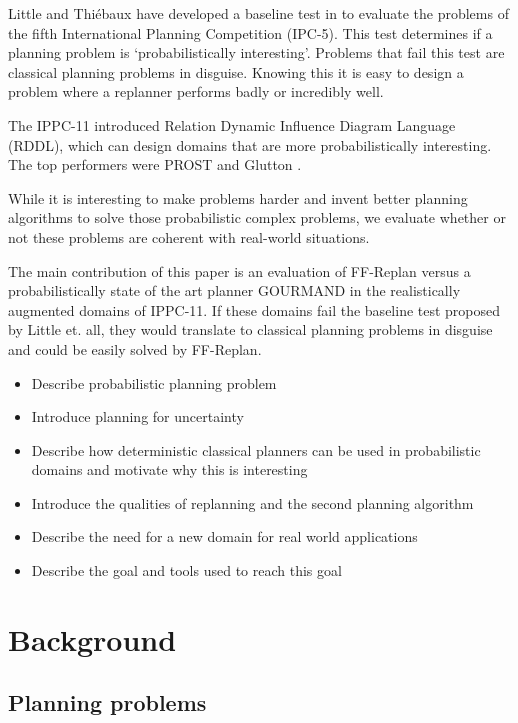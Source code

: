 \documentclass[runningheads,a4paper]{llncs}
\begin{document}
Little and Thi\'ebaux have developed a baseline test in
\cite{little2007probvsreplan} to evaluate the problems of the fifth International
Planning Competition (IPC-5). This test determines if a planning problem is
`probabilistically interesting'. Problems that fail this test are classical
planning problems in disguise. Knowing this it is easy to design a problem
where a replanner performs badly or incredibly well.

The IPPC-11 introduced Relation Dynamic Influence Diagram Language (RDDL),
which can design domains that are more probabilistically interesting. The top
performers were PROST \cite{keller2012prost} and Glutton
\cite{kolobov2012glutton}.

While it is interesting to make problems harder and invent better planning
algorithms to solve those probabilistic complex problems, we evaluate whether
or not these problems are coherent with real-world situations.

The main contribution of this paper is an evaluation of FF-Replan versus a
probabilistically state of the art planner GOURMAND in the realistically
augmented domains of IPPC-11. If these domains fail the baseline test proposed
by Little et\@. all, they would translate to classical planning problems in
disguise and could be easily solved by FF-Replan.

\begin{itemize}
	\item Describe probabilistic planning problem
	\item Introduce planning for uncertainty
	\item Describe how deterministic classical planners can be used in probabilistic domains and motivate why this is interesting
	\item Introduce the qualities of replanning and the second planning algorithm
	\item Describe the need for a new domain for real world applications
	\item Describe the goal and tools used to reach this goal
\end{itemize}


\section{Background}

\subsection{Planning problems}
\end{document}
